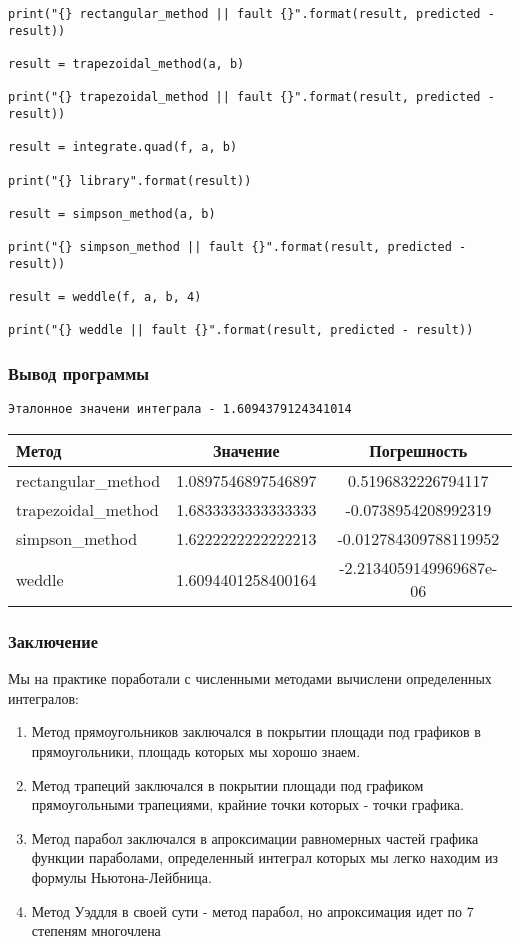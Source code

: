 \documentclass{article}
\newenvironment{codelisting}{\captionsetup{type=listing}}{}
\begin{document}
\begin{codelisting}
\begin{verbatim}
print("{} rectangular_method || fault {}".format(result, predicted - result))

result = trapezoidal_method(a, b)

print("{} trapezoidal_method || fault {}".format(result, predicted - result))

result = integrate.quad(f, a, b)

print("{} library".format(result))

result = simpson_method(a, b)

print("{} simpson_method || fault {}".format(result, predicted - result))

result = weddle(f, a, b, 4)

print("{} weddle || fault {}".format(result, predicted - result))
\end{verbatim}
\end{codelisting}

\subsubsection*{Вывод программы}

\begin{verbatim}
Эталонное значени интеграла - 1.6094379124341014
\end{verbatim}

\begin{tabular}{l||c||c}
     \hline
     Метод & Значение & Погрешность\\
     \hline\hline
     rectangular_method & 1.0897546897546897 & 0.5196832226794117 \\
     trapezoidal_method & 1.6833333333333333 & -0.0738954208992319\\
     simpson_method & 1.6222222222222213 & -0.012784309788119952\\
     weddle & 1.6094401258400164 & -2.2134059149969687e-06
\end{tabular}

\subsubsection*{Заключение}

Мы на практике поработали с численными методами вычислени определенных интегралов:

\begin{enumerate}
    \item Метод прямоугольников заключался в покрытии площади под графиков в прямоугольники, площадь которых мы хорошо знаем.
    \item Метод трапеций заключался в покрытии площади под графиком прямоугольными трапециями, крайние точки которых - точки графика.
    \item Метод парабол заключался в апроксимации равномерных частей графика функции параболами, определенный интеграл которых мы легко находим из формулы Ньютона-Лейбница. 
    \item Метод Уэддля в своей сути - метод парабол, но апроксимация идет по 7 степеням многочлена
\end{enumerate}
\end{document}
